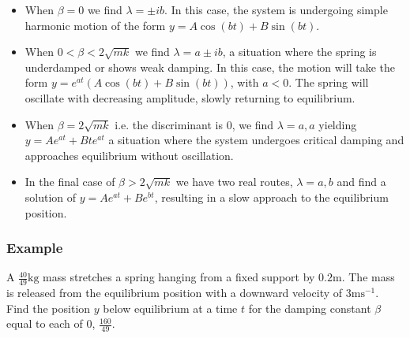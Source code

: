 \documentclass[12pt]{report}
\begin{document}
\begin{flushleft}
\begin{itemize}
    \item When \(\beta = 0\) we find \(\lambda = \pm ib\). In this case, the
        system is undergoing simple harmonic motion of the form
        \(y = A\cos(bt) + B\sin(bt)\).
    \item When \(0 < \beta < 2\sqrt{mk}\) we find \(\lambda = a \pm ib\), a
        situation where the spring is underdamped or shows weak damping. In
        this case, the motion will take the form
        \(y = e^{at}(A\cos(bt) + B\sin(bt))\), with \(a < 0\). The spring will
        oscillate with decreasing amplitude, slowly returning to equilibrium.
    \item When \(\beta = 2\sqrt{mk}\) i.e. the discriminant is \(0\), we find
        \(\lambda = a, a\) yielding \(y = Ae^{at} + Bte^{at}\) a situation
        where the system undergoes critical damping and approaches equilibrium
        without oscillation.
    \item In the final case of \(\beta > 2\sqrt{mk}\) we have two real routes,
        \(\lambda = a, b\) and find a solution of \(y = Ae^{at} + Be^{bt}\),
        resulting in a slow approach to the equilibrium position. 
\end{itemize}

\subsubsection*{Example}

A \(\frac{40}{49}\mathrm{kg}\) mass stretches a spring hanging from a fixed
support by \(0.2\mathrm{m}\). The mass is released from the equilibrium
position with a downward velocity of \(3\mathrm{ms}^{-1}\). Find the position
\(y\) below equilibrium at a time \(t\) for the damping constant \(\beta\)
equal to each of \(0\), \(\frac{160}{49}\).


\end{flushleft}
\end{document}
